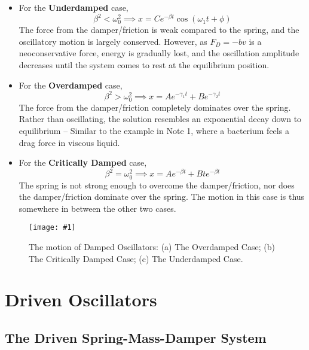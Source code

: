 \documentclass[11pt]{article}
\newcommand{\fig}[4]{
    \begin{figure}[H]
        \centering
        \texttt{[image: \#1]}
        \caption{#2}
        \label{exp4fit}
    \end{figure}
}
\theoremstyle{gangnamstyle}{\newtheorem{definition}{Definition}[]}
\theoremstyle{gangnamstyle}{\newtheorem{example}{Example}[]}
\theoremstyle{gangnamstyle}{\newtheorem{problem}{Problem}[]}
\theoremstyle{gangnamstyle}{\newtheorem{warning}{Warning}[]}
\begin{document}
\begin{itemize}
\item For the \textbf{Underdamped} case, 
\[ \beta^2 < \omega_0^2 \implies x = Ce^{-\beta t}\cos(\omega_1 t + \phi) \]
The force from the damper/friction is weak compared to the spring, and the oscillatory motion is largely conserved. However, as $F_D = -bv$ is a neoconservative force, energy is gradually lost, and the oscillation amplitude decreases until the system comes to rest at the equilibrium position. 
\item For the \textbf{Overdamped} case, 
\[ \beta^2 > \omega_0^2 \implies x = Ae^{-\gamma_1t} + Be^{-\gamma_2t} \]
The force from the damper/friction completely dominates over the spring. Rather than oscillating, the solution resembles an exponential decay down to equilibrium -- Similar to the example in Note 1, where a bacterium feels a drag force in viscous liquid. 
\item For the \textbf{Critically Damped} case, 
\[ \beta^2 = \omega_0^2 \implies x = Ae^{-\beta t} + Bte^{-\beta t} \]
The spring is not strong enough to overcome the damper/friction, nor does the damper/friction dominate over the spring. The motion in this case is thus somewhere in between the other two cases. 
\end{itemize}

\fig{figs/n2/oscillators.jpg}{The motion of Damped Oscillators: (a) The Overdamped Case; (b) The Critically Damped Case; (c) The Underdamped Case. }{0.6}{0}

\pagebreak

\section{Driven Oscillators}
\subsection{The Driven Spring-Mass-Damper System}
\end{document}
